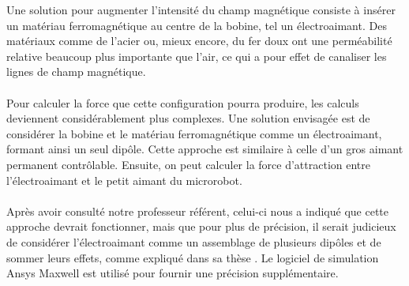 \documentclass{article}
\begin{document}
Une solution pour augmenter l'intensité du champ magnétique consiste à insérer un matériau ferromagnétique au centre de la bobine, tel un électroaimant. Des matériaux comme de l'acier ou, mieux encore, du fer doux ont une perméabilité relative beaucoup plus importante que l'air, ce qui a pour effet de canaliser les lignes de champ magnétique.
\\\\
Pour calculer la force que cette configuration pourra produire, les calculs deviennent considérablement plus complexes. Une solution envisagée est de considérer la bobine et le matériau ferromagnétique comme un électroaimant, formant ainsi un seul dipôle. Cette approche est similaire à celle d'un gros aimant permanent contrôlable. Ensuite, on peut calculer la force d'attraction entre l'électroaimant et le petit aimant du microrobot.
\\\\
Après avoir consulté notre professeur référent, celui-ci nous a indiqué que cette approche devrait fonctionner, mais que pour plus de précision, il serait judicieux de considérer l'électroaimant comme un assemblage de plusieurs dipôles et de sommer leurs effets, comme expliqué dans sa thèse \cite{ref8}. Le logiciel de simulation Ansys Maxwell est utilisé pour fournir une précision supplémentaire.
\end{document}
